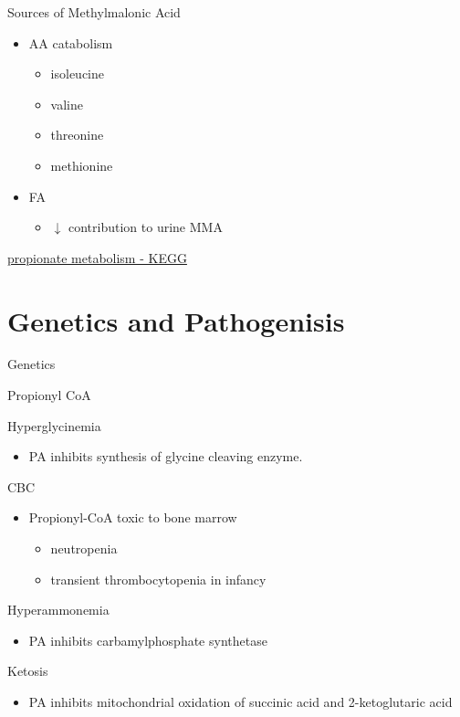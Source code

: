 \documentclass[presentation, smaller]{beamer}
\begin{document}
\begin{frame}[label={sec:orgheadline7}]{Sources of Methylmalonic Acid}
\begin{itemize}
\item AA catabolism
\begin{itemize}
\item isoleucine
\item valine
\item threonine
\item methionine
\end{itemize}
\item FA
\begin{itemize}
\item \(\downarrow\) contribution to urine MMA
\end{itemize}
\end{itemize}

\href{http://www.genome.jp/kegg-bin/show_pathway?org_name=hsa&mapno=00640&mapscale=&show_description=hide}{propionate metabolism - KEGG}
\end{frame}

\section{Genetics and Pathogenisis}
\label{sec:orgheadline12}

\begin{frame}[label={sec:orgheadline9}]{Genetics}
\end{frame}

\begin{frame}[label={sec:orgheadline10}]{Propionyl CoA}
\begin{block}{Hyperglycinemia}
\begin{itemize}
\item PA inhibits synthesis of glycine cleaving enzyme.
\end{itemize}
\end{block}
\begin{block}{CBC}
\begin{itemize}
\item Propionyl-CoA toxic to bone marrow
\begin{itemize}
\item neutropenia
\item transient thrombocytopenia in infancy
\end{itemize}
\end{itemize}
\end{block}
\begin{block}{Hyperammonemia}
\begin{itemize}
\item PA inhibits carbamylphosphate synthetase
\end{itemize}
\end{block}
\begin{block}{Ketosis}
\begin{itemize}
\item PA inhibits mitochondrial oxidation of succinic acid and 2-ketoglutaric acid
\end{itemize}
\end{block}
\end{frame}
\end{document}
